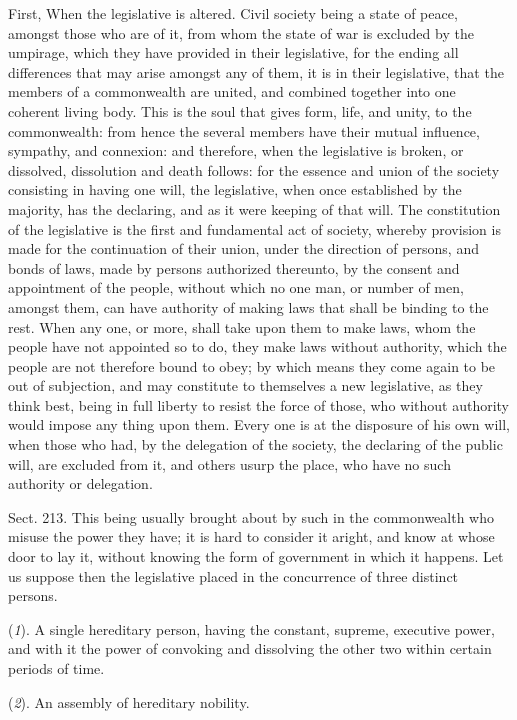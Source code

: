 \documentclass[11pt,openany]{book}
\begin{document}
First, When the legislative is altered. Civil society being a state of peace, amongst those who are of it, from whom the state of war is excluded by the umpirage, which they have provided in their legislative, for the ending all differences that may arise amongst any of them, it is in their legislative, that the members of a commonwealth are united, and combined together into one coherent living body. This is the soul that gives form, life, and unity, to the commonwealth: from hence the several members have their mutual influence, sympathy, and connexion: and therefore, when the legislative is broken, or dissolved, dissolution and death follows: for the essence and union of the society consisting in having one will, the legislative, when once established by the majority, has the declaring, and as it were keeping of that will. The constitution of the legislative is the first and fundamental act of society, whereby provision is made for the continuation of their union, under the direction of persons, and bonds of laws, made by persons authorized thereunto, by the consent and appointment of the people, without which no one man, or number of men, amongst them, can have authority of making laws that shall be binding to the rest. When any one, or more, shall take upon them to make laws, whom the people have not appointed so to do, they make laws without authority, which the people are not therefore bound to obey; by which means they come again to be out of subjection, and may constitute to themselves a new legislative, as they think best, being in full liberty to resist the force of those, who without authority would impose any thing upon them. Every one is at the disposure of his own will, when those who had, by the delegation of the society, the declaring of the public will, are excluded from it, and others usurp the place, who have no such authority or delegation.

Sect. 213. This being usually brought about by such in the commonwealth who misuse the power they have; it is hard to consider it aright, and know at whose door to lay it, without knowing the form of government in which it happens. Let us suppose then the legislative placed in the concurrence of three distinct persons.

(\emph{1}). A single hereditary person, having the constant, supreme, executive power, and with it the power of convoking and dissolving the other two within certain periods of time.

(\emph{2}). An assembly of hereditary nobility.
\end{document}
